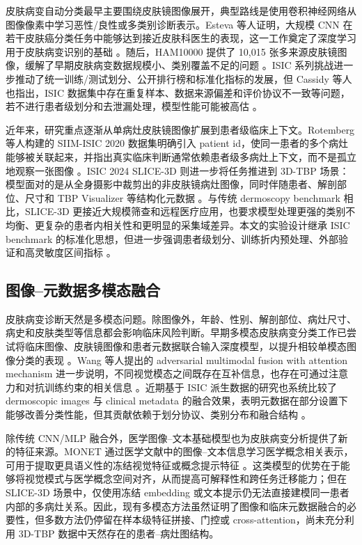 \documentclass[UTF8,a4paper,10pt,twocolumn,fontset=fandol]{ctexart}
\begin{document}
皮肤病变自动分类最早主要围绕皮肤镜图像展开，典型路线是使用卷积神经网络从图像像素中学习恶性/良性或多类别诊断表示。Esteva 等人证明，大规模 CNN 在若干皮肤癌分类任务中能够达到接近皮肤科医生的表现，这一工作奠定了深度学习用于皮肤病变识别的基础 \cite{esteva2017dermatologist}。随后，HAM10000 提供了 10,015 张多来源皮肤镜图像，缓解了早期皮肤病变数据规模小、类别覆盖不足的问题 \cite{tschandl2018ham10000}。ISIC 系列挑战进一步推动了统一训练/测试划分、公开排行榜和标准化指标的发展，但 Cassidy 等人也指出，ISIC 数据集中存在重复样本、数据来源偏差和评价协议不一致等问题，若不进行患者级划分和去泄漏处理，模型性能可能被高估 \cite{cassidy2022isic}。

近年来，研究重点逐渐从单病灶皮肤镜图像扩展到患者级临床上下文。Rotemberg 等人构建的 SIIM-ISIC 2020 数据集明确引入 patient id，使同一患者的多个病灶能够被关联起来，并指出真实临床判断通常依赖患者级多病灶上下文，而不是孤立地观察一张图像 \cite{rotemberg2021patient}。ISIC 2024 SLICE-3D 则进一步将任务推进到 3D-TBP 场景：模型面对的是从全身摄影中裁剪出的非皮肤镜病灶图像，同时伴随患者、解剖部位、尺寸和 TBP Visualizer 等结构化元数据 \cite{kurtansky2024slice3d}。与传统 dermoscopy benchmark 相比，SLICE-3D 更接近大规模筛查和远程医疗应用，也要求模型处理更强的类别不均衡、更复杂的患者内相关性和更明显的采集域差异。本文的实验设计继承 ISIC benchmark 的标准化思想，但进一步强调患者级划分、训练折内预处理、外部验证和高灵敏度区间指标 \cite{cassidy2022isic,isic2024challenge}。

\subsection{图像--元数据多模态融合}

皮肤病变诊断天然是多模态问题。除图像外，年龄、性别、解剖部位、病灶尺寸、病史和皮肤类型等信息都会影响临床风险判断。早期多模态皮肤病变分类工作已尝试将临床图像、皮肤镜图像和患者元数据联合输入深度模型，以提升相较单模态图像分类的表现 \cite{yap2018multimodal}。Wang 等人提出的 adversarial multimodal fusion with attention mechanism 进一步说明，不同视觉模态之间既存在互补信息，也存在可通过注意力和对抗训练约束的相关信息 \cite{wang2022amfam}。近期基于 ISIC 派生数据的研究也系统比较了 dermoscopic images 与 clinical metadata 的融合效果，表明元数据在部分设置下能够改善分类性能，但其贡献依赖于划分协议、类别分布和融合结构 \cite{ahammed2025metadata}。

除传统 CNN/MLP 融合外，医学图像--文本基础模型也为皮肤病变分析提供了新的特征来源。MONET 通过医学文献中的图像--文本信息学习医学概念相关表示，可用于提取更具语义性的冻结视觉特征或概念提示特征 \cite{kim2024monet}。这类模型的优势在于能够将视觉模式与医学概念空间对齐，从而提高可解释性和跨任务迁移能力；但在 SLICE-3D 场景中，仅使用冻结 embedding 或文本提示仍无法直接建模同一患者内部的多病灶关系。因此，现有多模态方法虽然证明了图像和临床元数据融合的必要性，但多数方法仍停留在样本级特征拼接、门控或 cross-attention，尚未充分利用 3D-TBP 数据中天然存在的患者--病灶图结构。
\end{document}

